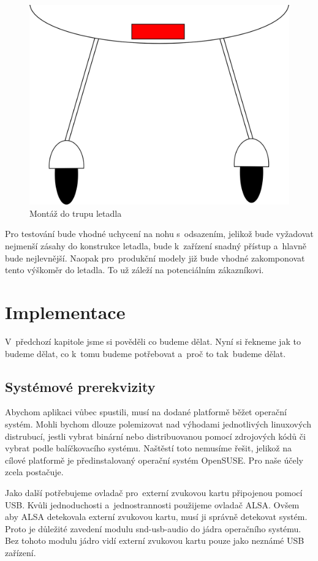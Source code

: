\begin{itemize}
			\begin{figure}[H]
				\begin{center}
					\includegraphics[scale=0.5]{obrazky-figures/umisteni_v_trupu.png}
					\caption{Montáž do trupu letadla}
					\label{navrh::umisteniuvnitr}
				\end{center}
			\end{figure}
			
		\end{itemize} 
		
		Pro testování bude vhodné uchycení na nohu s~odsazením, jelikož bude vyžadovat nejmenší zásahy do konstrukce letadla, bude k~zařízení snadný přístup a~hlavně bude nejlevnější.
		Naopak pro~produkční modely již bude vhodné zakomponovat tento výškoměr do letadla. To už záleží na potenciálním zákazníkovi.
		
\chapter{Implementace}
	V~předchozí kapitole jsme si pověděli co budeme dělat. Nyní si řekneme jak to budeme dělat, co k~tomu budeme potřebovat a~proč to tak~budeme dělat.\par
	
	\section{Systémové prerekvizity}
	Abychom aplikaci vůbec spustili, musí na dodané platformě běžet operační systém. Mohli bychom dlouze polemizovat nad výhodami jednotlivých linuxových distrubucí, jestli vybrat binární nebo distribuovanou pomocí zdrojových kódů či vybrat podle balíčkovacího systému. Naštěstí toto nemusíme řešit, jelikož na cílové platformě je předinstalovaný operační systém OpenSUSE. Pro naše účely zcela postačuje.\par
	Jako další potřebujeme ovladač pro~externí zvukovou kartu připojenou pomocí USB. Kvůli jednoduchosti a~jednostrannosti použijeme ovladač ALSA. Ovšem aby ALSA detekovala externí zvukovou kartu, musí ji správně detekovat systém. Proto je důležité zavedení modulu snd-usb-audio do jádra operačního systému. Bez tohoto modulu jádro vidí externí zvukovou kartu pouze jako neznámé USB zařízení.\par
	
